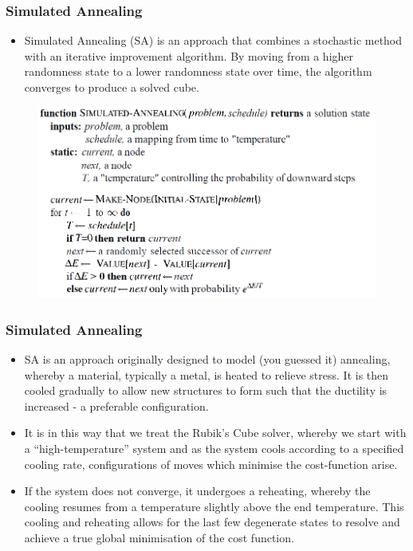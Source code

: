 \documentclass{beamer}
\begin{document}
\begin{frame}
\frametitle{Simulated Annealing}
\begin{itemize}
    \item Simulated Annealing (SA) is an approach that combines a stochastic method with an iterative improvement algorithm. By moving from a higher randomness state to a lower randomness state over time, the algorithm converges to produce a solved cube.
\end{itemize}

\begin{figure}[!h]
\begin{small}
\centering
\linespread{1.0}
\includegraphics[width=0.75\linewidth]{images/simulated annealing}
\label{fig:fig12}
\end{small}
\end{figure}

\end{frame}

\begin{frame}
\frametitle{Simulated Annealing}
\begin{itemize}
    \item SA is an approach originally designed to model (you guessed it) annealing, whereby a material, typically a metal, is heated to relieve stress. It is then cooled gradually to allow new structures to form such that the ductility is increased - a preferable configuration.
    \item It is in this way that we treat the Rubik's Cube solver, whereby we start with a ``high-temperature'' system and as the system cools according to a specified cooling rate, configurations of moves which minimise the cost-function arise.
    \item If the system does not converge, it undergoes a reheating, whereby the cooling resumes from a temperature slightly above the end temperature. This cooling and reheating allows for the last few degenerate states to resolve and achieve a true global minimisation of the cost function.
\end{itemize}

\end{frame}
\end{document}

